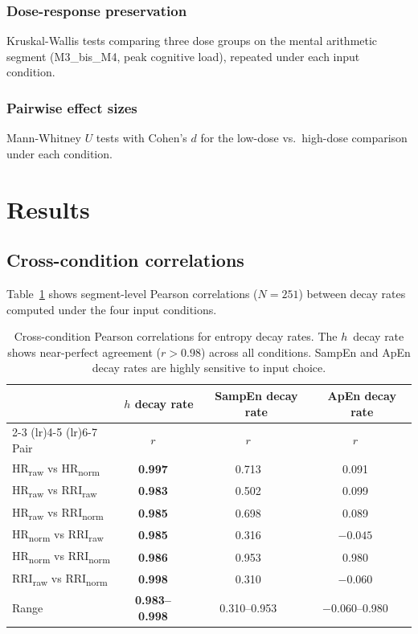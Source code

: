 \documentclass[12pt,a4paper]{article}
\begin{document}
\subsubsection{Dose-response preservation}
Kruskal-Wallis tests comparing three dose groups on the mental arithmetic segment (M3\_bis\_M4, peak cognitive load), repeated under each input condition.

\subsubsection{Pairwise effect sizes}
Mann-Whitney $U$ tests with Cohen's $d$ for the low-dose vs.\ high-dose comparison under each condition.


\section{Results}\label{sec:results}

\subsection{Cross-condition correlations}\label{sec:corr}

Table~\ref{tab:correlations} shows segment-level Pearson correlations ($N = 251$) between decay rates computed under the four input conditions.

\begin{table}[htbp]
\centering
\caption{Cross-condition Pearson correlations for entropy decay rates.
The $h$~decay rate shows near-perfect agreement ($r > 0.98$) across all conditions.
SampEn and ApEn decay rates are highly sensitive to input choice.}\label{tab:correlations}
\small
\begin{tabular}{l cccccc}
\toprule
& \multicolumn{2}{c}{$h$ decay rate} & \multicolumn{2}{c}{SampEn decay rate} & \multicolumn{2}{c}{ApEn decay rate} \\
\cmidrule(lr){2-3} \cmidrule(lr){4-5} \cmidrule(lr){6-7}
Pair & $r$ & & $r$ & & $r$ & \\
\midrule
HR\textsubscript{raw} vs HR\textsubscript{norm}   & \textbf{0.997} & & 0.713 & & 0.091 \\
HR\textsubscript{raw} vs RRI\textsubscript{raw}   & \textbf{0.983} & & 0.502 & & 0.099 \\
HR\textsubscript{raw} vs RRI\textsubscript{norm}  & \textbf{0.985} & & 0.698 & & 0.089 \\
HR\textsubscript{norm} vs RRI\textsubscript{raw}  & \textbf{0.985} & & 0.316 & & $-0.045$ \\
HR\textsubscript{norm} vs RRI\textsubscript{norm} & \textbf{0.986} & & 0.953 & & 0.980 \\
RRI\textsubscript{raw} vs RRI\textsubscript{norm} & \textbf{0.998} & & 0.310 & & $-0.060$ \\
\midrule
Range & \textbf{0.983--0.998} & & 0.310--0.953 & & $-0.060$--0.980 \\
\bottomrule
\end{tabular}
\end{table}
\end{document}
